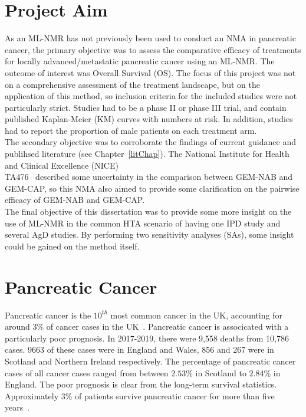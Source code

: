 \section{Project Aim}\label{sec:aims}
As an ML-NMR has not previously been used to conduct an NMA in pancreatic cancer, the primary objective was to assess the comparative efficacy of treatments for locally advanced/metastatic pancreatic cancer using an ML-NMR. The outcome of interest was Overall Survival (OS). The focus of this project was not on a comprehensive assessment of the treatment landscape, but on the application of this method, so inclusion criteria for the included studies were not particularly strict. Studies had to be a phase II or phase III trial, and contain published Kaplan-Meier (KM) curves with numbers at risk. In addition, studies had to report the proportion of male patients on each treatment arm. \\

The secondary objective was to corroborate the findings of current guidance and publihsed literature (see Chapter~\ref{litChap}). The National Institute for Health and Clinical Excellence (NICE) \\ TA476~\cite{TA476} described some uncertainty in the comparison between GEM-NAB and GEM-CAP, so this NMA also aimed to provide some clarification on the pairwise efficacy of GEM-NAB and GEM-CAP. \\

The final objective of this dissertation was to provide some more insight on the use of ML-NMR in the common HTA scenario of having one IPD study and several AgD studies. By performing two sensitivity analyses (SAs), some insight could be gained on the method itself. 

\section{Pancreatic Cancer}
Pancreatic cancer is the $10^{th}$ most common cancer in the UK, accounting for around $3\%$ of cancer cases in the UK~\cite{pancStat}. Pancreatic cancer is associcated with a particularly poor prognosis. In 2017-2019, there were 9,558 deaths from 10,786 cases. 9663 of these cases were in England and Wales, 856 and 267 were in Scotland and Northern Ireland respectively. The percentage of pancreatic cancer cases of all cancer cases ranged from between $2.53\%$ in Scotland to $2.84\%$ in England. The poor prognosis is clear from the long-term survival statistics. Approximately $3\%$ of patients survive pancreatic cancer for more than five years~\cite{NG85}.\\

